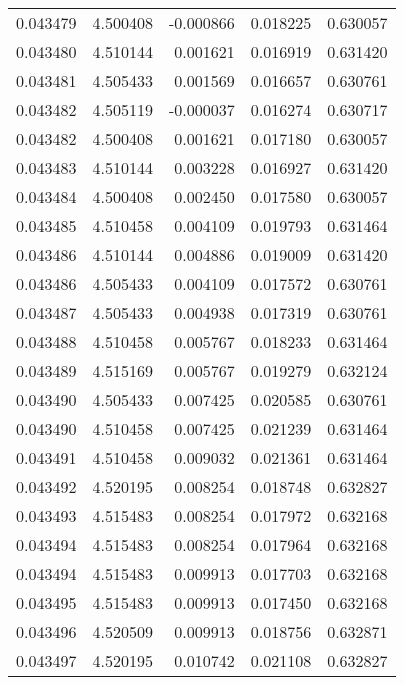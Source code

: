\begin{tabular}{lrrrr}
0.043479    &  4.500408 & -0.000866 &  0.018225 &             0.630057 \\
0.043480    &  4.510144 &  0.001621 &  0.016919 &             0.631420 \\
0.043481    &  4.505433 &  0.001569 &  0.016657 &             0.630761 \\
0.043482    &  4.505119 & -0.000037 &  0.016274 &             0.630717 \\
0.043482    &  4.500408 &  0.001621 &  0.017180 &             0.630057 \\
0.043483    &  4.510144 &  0.003228 &  0.016927 &             0.631420 \\
0.043484    &  4.500408 &  0.002450 &  0.017580 &             0.630057 \\
0.043485    &  4.510458 &  0.004109 &  0.019793 &             0.631464 \\
0.043486    &  4.510144 &  0.004886 &  0.019009 &             0.631420 \\
0.043486    &  4.505433 &  0.004109 &  0.017572 &             0.630761 \\
0.043487    &  4.505433 &  0.004938 &  0.017319 &             0.630761 \\
0.043488    &  4.510458 &  0.005767 &  0.018233 &             0.631464 \\
0.043489    &  4.515169 &  0.005767 &  0.019279 &             0.632124 \\
0.043490    &  4.505433 &  0.007425 &  0.020585 &             0.630761 \\
0.043490    &  4.510458 &  0.007425 &  0.021239 &             0.631464 \\
0.043491    &  4.510458 &  0.009032 &  0.021361 &             0.631464 \\
0.043492    &  4.520195 &  0.008254 &  0.018748 &             0.632827 \\
0.043493    &  4.515483 &  0.008254 &  0.017972 &             0.632168 \\
0.043494    &  4.515483 &  0.008254 &  0.017964 &             0.632168 \\
0.043494    &  4.515483 &  0.009913 &  0.017703 &             0.632168 \\
0.043495    &  4.515483 &  0.009913 &  0.017450 &             0.632168 \\
0.043496    &  4.520509 &  0.009913 &  0.018756 &             0.632871 \\
0.043497    &  4.520195 &  0.010742 &  0.021108 &             0.632827 \\

\end{tabular}
